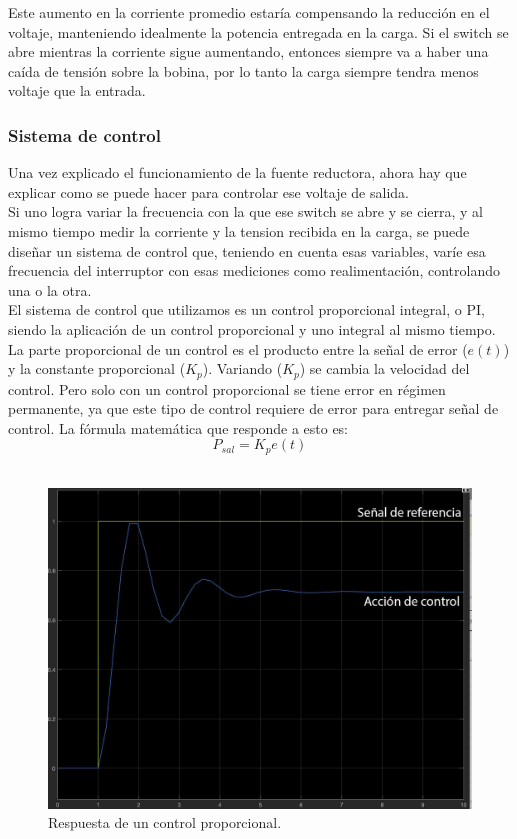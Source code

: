Este aumento en la corriente promedio estaría compensando la reducción en el voltaje, manteniendo idealmente la potencia entregada en la carga. Si el switch se abre mientras la corriente sigue aumentando, entonces siempre va a haber una caída de tensión sobre la bobina, por lo tanto la carga siempre tendra menos voltaje que la entrada.\\

\subsubsection{Sistema de control}
Una vez explicado el funcionamiento de la fuente reductora, ahora hay que explicar como se puede hacer para controlar ese voltaje de salida.\\

Si uno logra variar la frecuencia con la que ese switch se abre y se cierra, y al mismo tiempo medir la corriente y la tension recibida en la carga, se puede diseñar un sistema de control que, teniendo en cuenta esas variables, varíe esa frecuencia del interruptor con esas mediciones como realimentación, controlando una o la otra.\\

El sistema de control que utilizamos es un control proporcional integral, o PI, siendo la aplicación de un control proporcional y uno integral al mismo tiempo.\\

La parte proporcional de un control es el producto entre la señal de error ($e(t)$) y la constante proporcional ($K_{p}$). Variando ($K_{p}$) se cambia la velocidad del control. Pero solo con un control proporcional se tiene error en régimen permanente, ya que este tipo de control requiere de error para entregar señal de control. La fórmula matemática que responde a esto es:\\
\begin{equation}
    P_{sal}=K_{p} e(t)
\end{equation}\\

\begin{figure}[H]
    \centering
    \includegraphics[width=0.7\linewidth]{MPPT/Imagen 15-10-23 a las 14.52.JPG}
    \caption{Respuesta de un control proporcional.}
    \label{fig:proporcional}
\end{figure}

